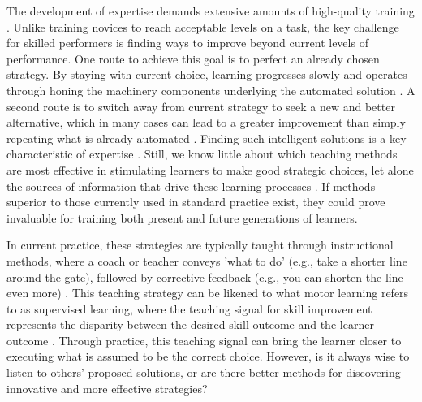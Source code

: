 \documentclass[pdflatex,sn-mathphys-num]{sn-jnl}%
\theoremstyle{thmstyleone}%
\theoremstyle{thmstyletwo}%
\theoremstyle{thmstylethree}%
\begin{document}
The development of expertise demands extensive amounts of high-quality training \cite{ericsson_role_1993, hodges_predicting_2004, vaeyens_talent_2009, sosniak_learning_1985}. Unlike training novices to reach acceptable levels on a task, the key challenge for skilled performers is finding ways to improve beyond current levels of performance\cite{ericsson_development_2003, ericsson_scientific_1998, gray_plateaus_2017, williams_expertise_2008, du_relationship_2022}. One route to achieve this goal is to perfect an already chosen strategy. By staying with current choice, learning progresses slowly and operates through honing the machinery components underlying the automated solution \cite{du_relationship_2022}. A second route is to switch away from current strategy to seek a new and better alternative, which in many cases can lead to a greater improvement than simply repeating what is already automated  \cite{gray_plateaus_2017, du_relationship_2022, krakauer_motor_2019}. Finding such intelligent solutions is a key characteristic of expertise \cite{ericsson_scientific_1998, ericsson_development_2003, krakauer_motor_2019, stanley_motor_2013}. Still, we know little about which teaching methods are most effective in stimulating learners to make good strategic choices, let alone the sources of information that drive these learning processes \cite{taylor_cerebellar_2014, taylor_role_2012}. If methods superior to those currently used in standard practice exist, they could prove invaluable for training both present and future generations of learners.

In current practice, these strategies are typically taught through instructional methods, where a coach or teacher conveys 'what to do' (e.g., take a shorter line around the gate), followed by corrective feedback (e.g., you can shorten the line even more) \cite{williams_practice_2005, williams_effective_2023, hodges_role_1999}. This teaching strategy can be likened to what motor learning refers to as supervised learning, where the teaching signal for skill improvement represents the disparity between the desired skill outcome and the learner outcome \cite{jordan_forward_1992, wolpert_motor_2010, doya_complementary_2000}. Through practice, this teaching signal can bring the learner closer to executing what is assumed to be the correct choice. However, is it always wise to listen to others' proposed solutions, or are there better methods for discovering innovative and more effective strategies?
\end{document}

